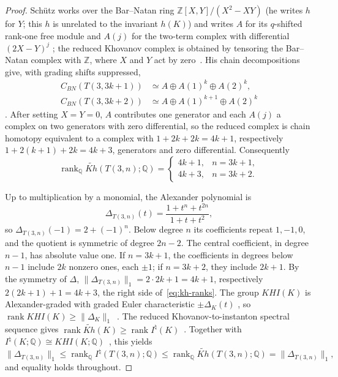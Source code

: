 \documentclass[11pt,reqno]{amsart}
\theoremstyle{plain}
\theoremstyle{definition}
\newcommand{\Z}{\mathbb{Z}}
\newcommand{\Inat}{I^{\natural}}
\begin{document}
\begin{proof}
Sch\"utz works over the Bar--Natan ring $\Z[X,Y]/(X^2-XY)$ (he writes $h$ for $Y$; this $h$ is unrelated to the invariant $h(K)$) and writes $A$ for its
$q$-shifted rank-one free module and $A(j)$ for the two-term complex with differential $(2X-Y)^j$
\cite[Def.~3.2]{Schutz}; the reduced Khovanov complex is obtained by tensoring the Bar--Natan complex
with $\Z$, where $X$ and $Y$ act by zero~\cite[\S3]{Schutz}. His chain decompositions give, with grading
shifts suppressed,
\begin{align*}
C_{BN}(T(3,3k+1))&\simeq A\oplus A(1)^k\oplus A(2)^k,\\
C_{BN}(T(3,3k+2))&\simeq A\oplus A(1)^{k+1}\oplus A(2)^k
\end{align*}
\cite[Thm.~5.3(2),(4)]{Schutz}. After setting $X=Y=0$, $A$ contributes one generator and each $A(j)$ a complex on two generators
with zero differential, so the reduced complex is chain homotopy equivalent to a complex with $1+2k+2k=4k+1$,
respectively $1+2(k+1)+2k=4k+3$, generators and zero differential. Consequently
\begin{equation}\label{eq:kh-ranks}
\operatorname{rank}_{\mathbb Q}\widetilde{Kh}(T(3,n);\mathbb Q)=
\begin{cases}
4k+1,&n=3k+1,\\
4k+3,&n=3k+2.
\end{cases}
\end{equation}

Up to multiplication by a monomial, the Alexander polynomial is
\[
\Delta_{T(3,n)}(t)=\frac{1+t^n+t^{2n}}{1+t+t^2},
\]
so $\Delta_{T(3,n)}(-1)=2+(-1)^n$. Below degree $n$ its coefficients repeat $1,-1,0$, and the quotient is
symmetric of degree $2n-2$. The central coefficient, in degree $n-1$, has absolute value one. If $n=3k+1$,
the coefficients in degrees below $n-1$ include $2k$ nonzero ones, each $\pm1$; if $n=3k+2$, they include
$2k+1$. By the symmetry of $\Delta$, $\|\Delta_{T(3,n)}\|_1=2\cdot2k+1=4k+1$, respectively
$2(2k+1)+1=4k+3$, the right side of~\eqref{eq:kh-ranks}. The group $KHI(K)$ is Alexander-graded with graded Euler characteristic $\pm\Delta_K(t)$
\cite[Thm.~1.1]{KMAlex}, so $\operatorname{rank}KHI(K)\ge\|\Delta_K\|_1$~\cite[Cor.~1.2]{KMAlex}. The
reduced Khovanov-to-instanton spectral sequence gives
$\operatorname{rank}\widetilde{Kh}(K)\ge\operatorname{rank}\Inat(K)$~\cite[Prop.~1.2, Cor.~1.3]{KM2}.
Together with $\Inat(K;\mathbb Q)\cong KHI(K;\mathbb Q)$~\cite[Prop.~1.4]{KM2}, this yields
\[
\|\Delta_{T(3,n)}\|_1\le \operatorname{rank}_{\mathbb Q}\Inat(T(3,n);\mathbb Q)
\le \operatorname{rank}_{\mathbb Q}\widetilde{Kh}(T(3,n);\mathbb Q)=\|\Delta_{T(3,n)}\|_1,
\]
and equality holds throughout.
\end{proof}
\end{document}

